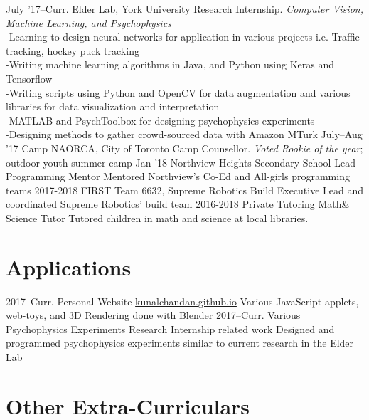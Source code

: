 \documentclass[]{chandan-cv}
\begin{document}
\begin{entrylist}
  \entry
    {July '17–Curr.}
    {Elder Lab, York University}
    {Research Internship.}
    {\emph{Computer Vision, Machine Learning, and Psychophysics}\\-Learning to design neural networks for application in various projects i.e. Traffic tracking, hockey puck tracking\\-Writing machine learning algorithms in Java, and Python using Keras and Tensorflow\\-Writing scripts using Python and OpenCV for data augmentation and various libraries for data visualization and interpretation\\-MATLAB and PsychToolbox for designing psychophysics experiments\\-Designing methods to gather crowd-sourced data with Amazon MTurk}
  \entry
    {July–Aug '17}
    {Camp NAORCA, City of Toronto}
    {Camp Counsellor.}
    {\emph{Voted Rookie of the year}; outdoor youth summer camp}
  \entry
    {Jan '18}
    {Northview Heights Secondary School}
    {Lead Programming Mentor}
    {Mentored Northview's Co-Ed and All-girls programming teams}
  \entry
    {2017-2018}
    {FIRST Team 6632, Supreme Robotics}
    {Build Executive}
    {Lead and coordinated Supreme Robotics' build team}
  \entry
    {2016-2018}
    {Private Tutoring}
    {Math\& Science Tutor}
    {Tutored children in math and science at local libraries.}
\end{entrylist}

\section{Applications}

\begin{entrylist}
  \entry
    {2017–Curr.}
    {Personal Website}
    {\href{https://kunalchandan.github.io}{kunalchandan.github.io}}
    {Various JavaScript applets, web-toys, and 3D Rendering done with Blender}
  \entry
    {2017–Curr.}
    {Various Psychophysics Experiments}
    {Research Internship related work}
    {Designed and programmed psychophysics experiments similar to current research in the Elder Lab}
\end{entrylist}

\newpage

\section{Other Extra-Curriculars}
\end{document}
